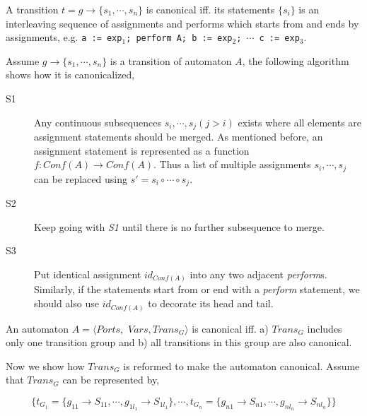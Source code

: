 \begin{definition}
A transition $t=g\rightarrow\{s_1,\cdots,s_n\}$ is canonical iff. its statements $\{s_i\}$ is an interleaving sequence of assignments and performs which starts from and ends by assignments, e.g. \texttt{a := exp$_1$; perform A; b := exp$_2$; $\cdots$ \texttt{c := exp$_3$}}.
\end{definition}

Assume $g\rightarrow\{s_1,\cdots,s_n\}$ is a transition of automaton $A$, the following algorithm shows how it is canonicalized,
\begin{description}
    \item[S1] Any continuous subsequences $s_i,\cdots,s_j(j>i)$ exists where all elements are assignment statements should be merged. As mentioned before, an assignment statement is represented as a function $f:Conf(A)\rightarrow Conf(A)$. Thus a list of multiple assignments $s_i,\cdots, s_j$ can be replaced using $s'=s_i\circ\cdots \circ s_j$.
    \item[S2] Keep going with \emph{S1} until there is no further subsequence to merge.
    \item[S3] Put identical assignment $id_{Conf(A)}$ into any two adjacent \emph{perform}s. Similarly, if the statements start from or end with a \emph{perform} statement, we should also use $id_{Conf(A)}$ to decorate its head and tail.
\end{description}

\begin{definition}
    An automaton $A=\langle Ports,$ $Vars,Trans_G\rangle$ is canonical iff. a) $Trans_G$ includes only one transition group and b) all transitions in this group are also canonical.
\end{definition}

Now we show how $Trans_G$ is reformed to make the automaton canonical.
Assume that $Trans_G$ can be represented by,
\begin{small}
\[
    \{t_{G_1}=\{g_{11}\rightarrow S_{11},\cdots, g_{1l_1}\rightarrow S_{1l_1}\},\cdots,t_{G_n}=\{g_{n1}\rightarrow S_{n1},\cdots,g_{nl_n}\rightarrow S_{nl_n}\}\}
\]
\end{small}

